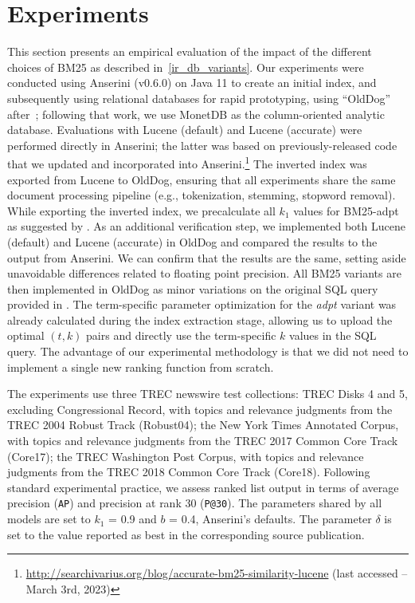\section{Experiments}
This section presents an empirical evaluation of the impact of the different choices of BM25 as described in~\cref{ir_db_variants}.
Our experiments were conducted using Anserini (v0.6.0) on Java 11 to create an initial index, and subsequently using relational databases for rapid prototyping, using ``OldDog''~\citep{olddog-docker} after~\citet{OldDog}; following that work, we use MonetDB as the column-oriented analytic database. Evaluations with Lucene (default) and Lucene (accurate) were performed directly in Anserini; the latter was based on previously-released code that we updated and incorporated into Anserini.\footnote{\url{http://searchivarius.org/blog/accurate-bm25-similarity-lucene} (last accessed -- March 3rd, 2023)} The inverted index was exported from Lucene to OldDog, ensuring that all experiments share the same document processing pipeline (e.g., tokenization, stemming, stopword removal). While exporting the inverted index, we precalculate all $k_1$ values for BM25-adpt as suggested by \citet{bm25-adpt}. As an additional verification step, we implemented both Lucene (default) and Lucene (accurate) in OldDog and compared the results to the output from Anserini. We can confirm that the results are the same, setting aside unavoidable differences related to floating point precision. All BM25 variants are then implemented in OldDog as minor variations on the original SQL query provided in \citet{OldDog}. The term-specific parameter optimization for the \emph{adpt} variant was already calculated during the index extraction stage, allowing us to upload the optimal $(t, k)$ pairs and directly use the term-specific $k$ values in the SQL query. The advantage of our experimental methodology is that we did not need to implement a single new ranking function from scratch.

The experiments use three TREC newswire test collections: TREC Disks 4 and 5, excluding Congressional Record, with topics and relevance judgments from the TREC 2004 Robust Track (Robust04); the New York Times Annotated Corpus, with topics and relevance judgments from the TREC 2017 Common Core Track (Core17); the TREC Washington Post Corpus, with topics and relevance judgments from the TREC 2018 Common Core Track (Core18). Following standard experimental practice, we assess ranked list output in terms of average precision (\texttt{AP}) and precision at rank 30 (\texttt{P@30}). The parameters shared by all models are set to $k_1$ = 0.9 and $b$ = 0.4, Anserini’s defaults. The parameter $\delta$ is set to the value reported as best in the corresponding source publication. 

